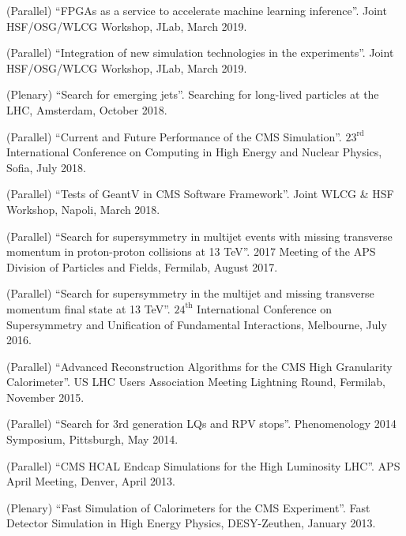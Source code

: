 \begin{description}[leftmargin=12pt,font=\normalfont,labelsep=0em]
\item (Parallel) ``FPGAs as a service to accelerate machine learning inference''. Joint HSF/OSG/WLCG Workshop, JLab, March 2019.
\item (Parallel) ``Integration of new simulation technologies in the experiments''. Joint HSF/OSG/WLCG Workshop, JLab, March 2019.
\item (Plenary) ``Search for emerging jets''. Searching for long-lived particles at the LHC, Amsterdam, October 2018.
\item (Parallel) ``Current and Future Performance of the CMS Simulation''. $23^{\text{rd}}$ International Conference on Computing in High Energy and Nuclear Physics, Sofia, July 2018.
\item (Parallel) ``Tests of GeantV in CMS Software Framework''. Joint WLCG \& HSF Workshop, Napoli, March 2018.
\item (Parallel) ``Search for supersymmetry in multijet events with missing transverse momentum in proton-proton collisions at 13 TeV''. 2017 Meeting of the APS Division of Particles and Fields, Fermilab, August 2017.
\item (Parallel) ``Search for supersymmetry in the multijet and missing transverse momentum final state at 13 TeV''. $24^{\text{th}}$ International Conference on Supersymmetry and Unification of Fundamental Interactions, Melbourne, July 2016.
\item (Parallel) ``Advanced Reconstruction Algorithms for the CMS High Granularity Calorimeter''. US LHC Users Association Meeting Lightning Round, Fermilab, November 2015.
\item (Parallel) ``Search for 3rd generation LQs and RPV stops''. Phenomenology 2014 Symposium, Pittsburgh, May 2014.
\item (Parallel) ``CMS HCAL Endcap Simulations for the High Luminosity LHC''. APS April Meeting, Denver, April 2013.
\item (Plenary) ``Fast Simulation of Calorimeters for the CMS Experiment''. Fast Detector Simulation in High Energy Physics, DESY-Zeuthen, January 2013.
\end{description}

